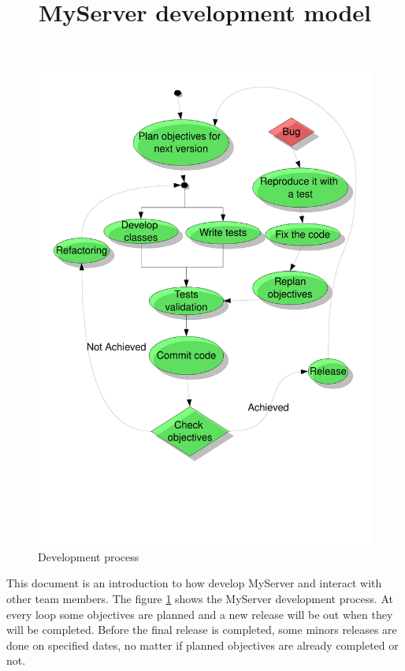 \documentclass[12pt]{article}
\date{}
\author{}
\title{MyServer development model}
\begin{document}
\maketitle
\thispagestyle{empty}

\newpage

\begin{figure}[H]
  \begin{center}
    \includegraphics[height=0.9\textheight]{dev_scheme}
  \end{center}
  \caption{Development process}
  \label{figure:dev_proc}
\end{figure}
This document is an introduction to how develop MyServer and interact
with other team members.
The figure \ref{figure:dev_proc} shows the MyServer development
process.
At every loop some objectives are planned and a new release will be
out when they will be completed.
Before the final release is completed, some minors releases are done
on specified dates, no matter if planned objectives are already
completed or not.
\end{document}
